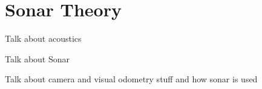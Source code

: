 \section{Sonar Theory}

Talk about acoustics

Talk about Sonar

Talk about camera and visual odometry stuff and how sonar is used
